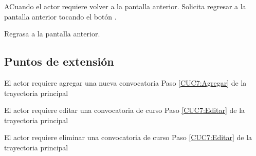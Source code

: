 	\begin{UCtrayectoriaA}{A}{Cuando el actor requiere volver a la pantalla anterior.}
		\UCpaso[\UCactor] Solicita regresar a la pantalla anterior tocando el botón .
		
		\UCpaso [\UCsist] Regrasa a la pantalla anterior.
	\end{UCtrayectoriaA}
	
	\subsection{Puntos de extensión}
	
	\UCExtensionPoint
	{El actor requiere agregar una nueva convocatoria}
	{ Paso \ref{CUC7:Agregar} de la trayectoria principal}
	{}
	
	\UCExtensionPoint
	{El actor requiere editar una convocatoria de curso}
	{ Paso \ref{CUC7:Editar} de la trayectoria principal}
	{}
	
	\UCExtensionPoint
	{El actor requiere eliminar una convocatoria de curso}
	{ Paso \ref{CUC7:Editar} de la trayectoria principal}
	{}
